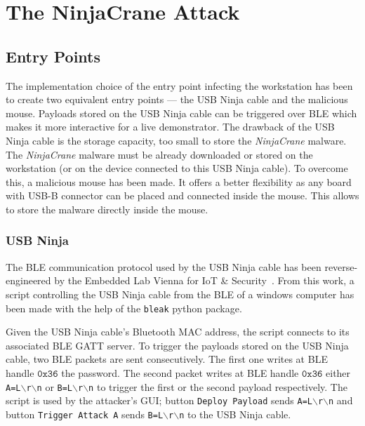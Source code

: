 \chapter{The NinjaCrane Attack}
\label{chapter:ninja-crane-atk}

\section{Entry Points}

The implementation choice of the entry point infecting the workstation has been to create two equivalent entry points — the USB Ninja cable and the malicious mouse. Payloads stored on the USB Ninja cable can be triggered over BLE which makes it more interactive for a live demonstrator. The drawback of the USB Ninja cable is the storage capacity, too small to store the \emph{NinjaCrane} malware. The \emph{NinjaCrane} malware must be already downloaded or stored on the workstation (or on the device connected to this USB Ninja cable). To overcome this, a malicious mouse has been made. It offers a better flexibility as any board with USB-B connector can be placed and connected inside the mouse. This allows to store the malware directly inside the mouse.

\subsection{USB Ninja}

The BLE communication protocol used by the USB Ninja cable has been reverse-engineered by the Embedded Lab Vienna for IoT \& Security~\cite{ninja-cable-reverse}. From this work, a script controlling the USB Ninja cable from the BLE of a windows computer has been made with the help of the \texttt{bleak} python package.

Given the USB Ninja cable's Bluetooth MAC address, the script connects to its associated BLE GATT server. To trigger the payloads stored on the USB Ninja cable, two BLE packets are sent consecutively. The first one writes at BLE handle $\texttt{0x36}$ the password. The second packet writes at BLE handle $\texttt{0x36}$ either \texttt{A=L$\backslash$r$\backslash$n} or \texttt{B=L$\backslash$r$\backslash$n} to trigger the first or the second payload respectively. The script is used by the attacker's GUI; button \texttt{Deploy Payload} sends \texttt{A=L$\backslash$r$\backslash$n} and button \texttt{Trigger Attack A} sends \texttt{B=L$\backslash$r$\backslash$n} to the USB Ninja cable.

